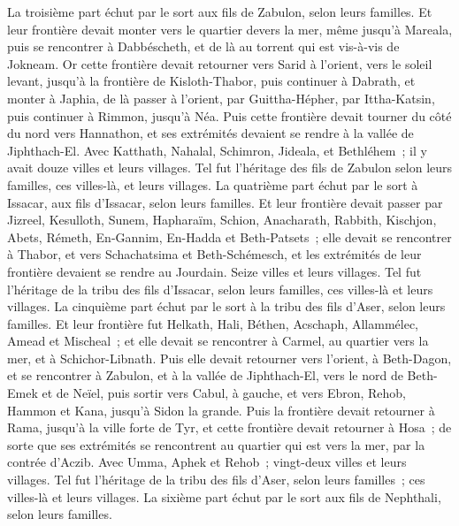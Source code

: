 \begin{multicols}{2}
La troisième part échut par le sort aux fils de Zabulon, selon leurs familles.
Et leur frontière devait monter vers le quartier devers la mer, même jusqu'à Mareala, puis se rencontrer à Dabbéscheth, et de là au torrent qui est vis-à-vis de Jokneam.
Or cette frontière devait retourner vers Sarid à l'orient, vers le soleil levant, jusqu'à la frontière de Kisloth-Thabor, puis continuer à Dabrath, et monter à Japhia,
de là passer à l'orient, par Guittha-Hépher, par Ittha-Katsin, puis continuer à Rimmon, jusqu'à Néa.
Puis cette frontière devait tourner du côté du nord vers Hannathon, et ses extrémités devaient se rendre à la vallée de Jiphthach-El.
Avec Katthath, Nahalal, Schimron, Jideala, et Bethléhem~; il y avait douze villes et leurs villages.
Tel fut l'héritage des fils de Zabulon selon leurs familles, ces villes-là, et leurs villages.
La quatrième part échut par le sort à Issacar, aux fils d'Issacar, selon leurs familles.
Et leur frontière devait passer par Jizreel, Kesulloth, Sunem,
Hapharaïm, Schion, Anacharath,
Rabbith, Kischjon, Abets,
Rémeth, En-Gannim, En-Hadda et Beth-Patsets~;
elle devait se rencontrer à Thabor, et vers Schachatsima et Beth-Schémesch, et les extrémités de leur frontière devaient se rendre au Jourdain. Seize villes et leurs villages.
Tel fut l'héritage de la tribu des fils d'Issacar, selon leurs familles, ces villes-là et leurs villages.
La cinquième part échut par le sort à la tribu des fils d'Aser, selon leurs familles.
Et leur frontière fut Helkath, Hali, Béthen, Acschaph,
Allammélec, Amead et Mischeal~; et elle devait se rencontrer à Carmel, au quartier vers la mer, et à Schichor-Libnath.
Puis elle devait retourner vers l'orient, à Beth-Dagon, et se rencontrer à Zabulon, et à la vallée de Jiphthach-El, vers le nord de Beth-Emek et de Neïel, puis sortir vers Cabul, à gauche,
et vers Ebron, Rehob, Hammon et Kana, jusqu'à Sidon la grande.
Puis la frontière devait retourner à Rama, jusqu'à la ville forte de Tyr, et cette frontière devait retourner à Hosa~; de sorte que ses extrémités se rencontrent au quartier qui est vers la mer, par la contrée d'Aczib.
Avec Umma, Aphek et Rehob~; vingt-deux villes et leurs villages.
Tel fut l'héritage de la tribu des fils d'Aser, selon leurs familles~; ces villes-là et leurs villages.
La sixième part échut par le sort aux fils de Nephthali, selon leurs familles.

\end{multicols}
